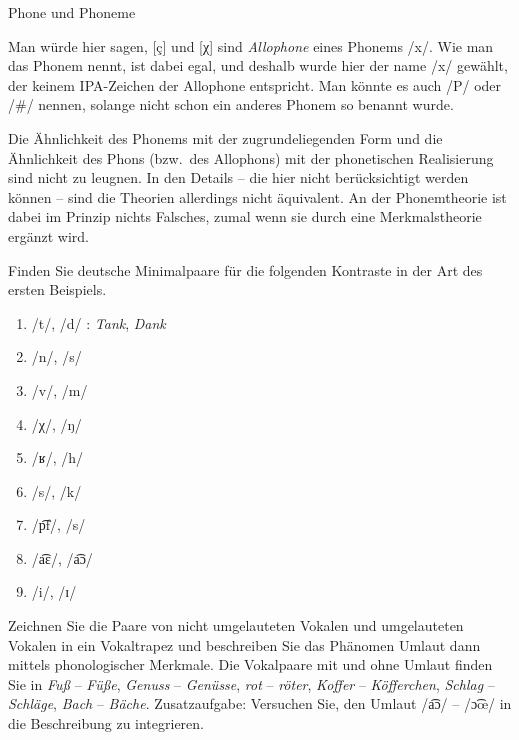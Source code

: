 \begin{Vertiefung}{Phone und Phoneme}
\begin{exe}
  \ex\label{ex:prosodischewoerter177}
  \begin{xlist}
  \end{xlist}
\end{exe}

Man würde hier sagen, [ç] und [χ] sind \textit{Allophone} eines Phonems /x/.
Wie man das Phonem nennt, ist dabei egal, und deshalb wurde hier der name /x/ gewählt, der keinem IPA-Zeichen der Allophone entspricht.
Man könnte es auch /P/ oder /\#/ nennen, solange nicht schon ein anderes Phonem so benannt wurde.

Die Ähnlichkeit des Phonems mit der zugrundeliegenden Form und die Ähnlichkeit des Phons (bzw.\ des Allophons) mit der phonetischen Realisierung sind nicht zu leugnen.
In den Details -- die hier nicht berücksichtigt werden können -- sind die Theorien allerdings nicht äquivalent.
An der Phonemtheorie ist dabei im Prinzip nichts Falsches, zumal wenn sie durch eine Merkmalstheorie ergänzt wird.

\end{Vertiefung}

\Uebungen

 \label{exc:phonologie01} Finden Sie deutsche Minimalpaare für die folgenden Kontraste in der Art des ersten Beispiels.

\begin{enumerate}
  \item{/t/, /d/ : \textit{Tank}, \textit{Dank}}
  \item{/n/, /s/}
  \item{/v/, /m/}
  \item{/χ/, /ŋ/}
  \item{/ʁ/, /h/}
  \item{/s/, /k/}
  \item{/p͡f/, /s/}
  \item{/a͡ɛ/, /a͡ɔ/}
  \item{/i/, /ɪ/}
\end{enumerate}

 \label{exc:phonologie02} Zeichnen Sie die Paare von nicht umgelauteten Vokalen und umgelauteten Vokalen in ein Vokaltrapez und beschreiben Sie das Phänomen Umlaut dann mittels phonologischer Merkmale.
Die Vokalpaare mit und ohne Umlaut finden Sie in \textit{Fuß} -- \textit{Füße}, \textit{Genuss} -- \textit{Genüsse}, \textit{rot} -- \textit{röter}, \textit{Koffer} -- \textit{Köfferchen}, \textit{Schlag} -- \textit{Schläge}, \textit{Bach} -- \textit{Bäche}.
Zusatzaufgabe: Versuchen Sie, den Umlaut /a͡ɔ/ -- /ɔ͡œ/ in die Beschreibung zu integrieren.

